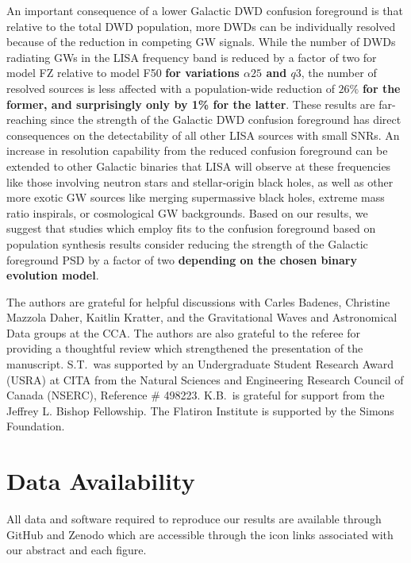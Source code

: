 \documentclass[twocolumn, linenumbers]{aastex631}
\begin{document}
An important consequence of a lower Galactic DWD confusion foreground is that relative to the total DWD population, more DWDs can be individually resolved because of the reduction in competing GW signals. While the number of DWDs radiating GWs in the LISA frequency band is reduced by a factor of two for model FZ relative to model F50 \textbf{for variations $\alpha25$ and $q3$}, the number of resolved sources is less affected with a population-wide reduction of $26\%$ \textbf{for the former, and surprisingly only by 1\% for the latter}. These results are far-reaching since the strength of the Galactic DWD confusion foreground has direct consequences on the detectability of all other LISA sources with small SNRs. An increase in resolution capability from the reduced confusion foreground can be extended to other Galactic binaries that LISA will observe at these frequencies like those involving neutron stars and stellar-origin black holes, as well as other more exotic GW sources like merging supermassive black holes, extreme mass ratio inspirals, or cosmological GW backgrounds. Based on our results, we suggest that studies which employ fits to the confusion foreground based on population synthesis results consider reducing the strength of the Galactic foreground PSD by a factor of two \textbf{depending on the chosen binary evolution model}.

\begin{acknowledgments}
The authors are grateful for helpful discussions with Carles Badenes, Christine Mazzola Daher, Kaitlin Kratter, and the Gravitational Waves and Astronomical Data groups at the CCA. The authors are also grateful to the referee for providing a thoughtful review which strengthened the presentation of the manuscript. S.T.\ was supported by an Undergraduate Student Research Award (USRA) at CITA from the Natural Sciences and Engineering Research Council of Canada (NSERC), Reference \# 498223. K.B.\ is grateful for support from the Jeffrey L. Bishop Fellowship. The Flatiron Institute is supported by the Simons Foundation.
\end{acknowledgments}

\section*{Data Availability}

All data and software required to reproduce our results are available through GitHub and Zenodo which are accessible through the icon links associated with our abstract and each figure.
\end{document}
